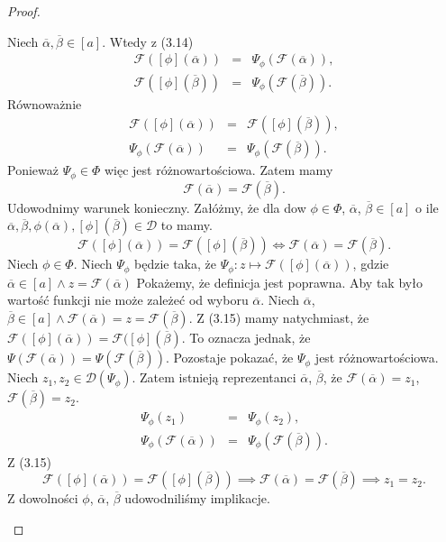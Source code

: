 \documentclass[12pt,a4paper]{report}
\newcommand{\domkniecie}[1]{\left[ {#1} \right] }
\begin{document}
\begin{proof}
\begin{enumerate}
Niech $\overline{\alpha}, \overline{\beta} \in \domkniecie{a}$. Wtedy z (3.14)
\begin{eqnarray*}
\mathcal{F}(\domkniecie{\phi}(\overline{\alpha}))&=&\Psi_{\phi}(\mathcal{F}(\overline{\alpha})),\\
\mathcal{F}(\domkniecie{\phi}(\overline{\beta}))&=&\Psi_{\phi}(\mathcal{F}(\overline{\beta})).
\end{eqnarray*}
Równoważnie
\begin{eqnarray*}
\mathcal{F}(\domkniecie{\phi}(\overline{\alpha}))&=&\mathcal{F}(\domkniecie{\phi}(\overline{\beta})),\\
\Psi_{\phi}(\mathcal{F}(\overline{\alpha}))&=&\Psi_{\phi}(\mathcal{F}(\overline{\beta})).
\end{eqnarray*}
Ponieważ $\Psi_{\phi} \in \Phi$ więc jest różnowartościowa. Zatem mamy
$$
\mathcal{F}(\overline{\alpha})=\mathcal{F}(\overline{\beta}).
$$
Udowodnimy warunek konieczny. Załóżmy, że dla dow $\phi \in \Phi$, $\overline{\alpha}$, $\overline{\beta} \in \domkniecie{a}$ o ile $\overline{\alpha}, \overline{\beta}, \phi(\overline{\alpha}), \domkniecie{\phi}(\overline{\beta}) \in \mathcal{D}$ to mamy.
\begin{equation}
\mathcal{F}(\domkniecie{\phi}(\overline{\alpha}))=\mathcal{F}(\domkniecie{\phi}(\overline{\beta})) \iff \mathcal{F}(\overline{\alpha})=\mathcal{F}(\overline{\beta}).
\end{equation}
Niech $\phi \in \Phi$. Niech $\Psi_{\phi}$ będzie taka, że $\Psi_{\phi}: z\longmapsto \mathcal{F}(\domkniecie{\phi}(\overline{\alpha}))$, gdzie $\overline{\alpha} \in \domkniecie{a} \land z=\mathcal{F}(\overline{\alpha})$
Pokażemy, że definicja jest poprawna. Aby tak było wartość funkcji nie może zależeć od wyboru $\overline{\alpha}$. 
Niech $\overline{\alpha}$, $\overline{\beta} \in \domkniecie{a} \land \mathcal{F}(\overline{\alpha})=z=\mathcal{F}(\overline{\beta})$. Z (3.15) mamy natychmiast, że $\mathcal{F}(\domkniecie{\phi}(\overline{\alpha}))=\mathcal{F}(\domkniecie{\phi}(\overline{\beta})$. To oznacza jednak, że $\Psi(\mathcal{F}(\overline{\alpha}))=\Psi(\mathcal{F}(\overline{\beta}))$. Pozostaje pokazać, że $\Psi_{\phi}$ jest różnowartościowa. Niech $z_1, z_2 \in \mathcal{D}(\Psi_{\phi})$. Zatem istnieją reprezentanci $\overline{\alpha}$, $\overline{\beta}$, że $\mathcal{F}(\overline{\alpha})=z_1$, $\mathcal{F}(\overline{\beta})=z_2$.
\begin{eqnarray*}
\Psi_{\phi}(z_1)&=&\Psi_{\phi}(z_2),\\
\Psi_{\phi}(\mathcal{F}(\overline{\alpha}))&=&\Psi_{\phi}(\mathcal{F}(\overline{\beta})).
\end{eqnarray*}
Z (3.15)
$$
\mathcal{F}(\domkniecie{\phi}(\overline{\alpha}))=\mathcal{F}(\domkniecie{\phi}(\overline{\beta})) \implies \mathcal{F}(\overline{\alpha})=\mathcal{F}(\overline{\beta}) \implies z_1=z_2.
$$
Z dowolności $\phi$, $\overline{\alpha}$, $\overline{\beta}$ udowodniliśmy implikacje.
\end{enumerate}
\end{proof}
\end{document}
